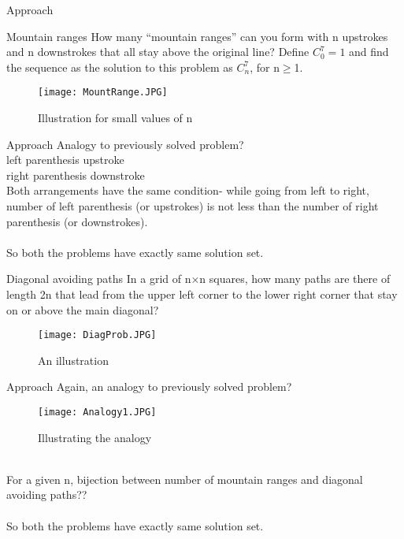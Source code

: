 \documentclass[handout, dvipsnames]{beamer}
\theoremstyle{definition}
\begin{document}
\begin{frame}{Approach}
    
\end{frame}

\begin{frame}{Mountain ranges}
    How many “mountain ranges” can you form with n upstrokes and n downstrokes that all stay above the original line? Define $C_0^7=1$ and find the sequence as the solution to this problem as $C_n^7$, for n$\geq$1. 
    \begin{figure}
        \centering
        \texttt{[image: MountRange.JPG]}
        \caption{Illustration for small values of n}
        \label{fig:my_label}
    \end{figure}
\end{frame}

\begin{frame}{Approach}
    Analogy to previously solved problem?\\
    left parenthesis \longrightarrow upstroke \\
    right parenthesis \longrightarrow downstroke \\
    Both arrangements have the same condition- while going from left to right, number of left parenthesis (or upstrokes) is not less than the number of right parenthesis (or downstrokes).\\\\
    So both the problems have exactly same solution set. 
\end{frame}

\begin{frame}{Diagonal avoiding paths}
    In a grid of n×n squares, how many paths are there of length 2n that lead from the upper left corner to the lower right corner that stay on or above the main diagonal?
    \begin{figure}
        \centering
        \texttt{[image: DiagProb.JPG]}
        \caption{An illustration }
        \label{fig:my_label}
    \end{figure}
\end{frame}

\begin{frame}{Approach}
    Again, an analogy to previously solved problem?\\
    \begin{figure}
        \centering
        \texttt{[image: Analogy1.JPG]}
        \caption{Illustrating the analogy}
        \label{fig:my_label}
    \end{figure}\\
    For a given n, bijection between number of mountain ranges and diagonal avoiding paths??\\\\
    So both the problems have exactly same solution set. 
\end{frame}
\end{document}
